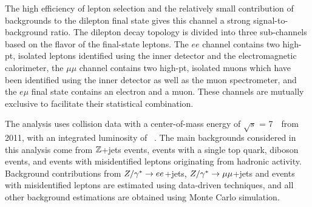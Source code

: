 The high efficiency of lepton selection and the relatively small contribution of backgrounds
to the dilepton final state %
gives this channel a strong signal-to-background ratio.
The dilepton decay topology is divided into three sub-channels based on the flavor of the
final-state leptons.
The $ee$ channel contains two high-pt, isolated leptons identified using 
the inner detector and the electromagnetic calorimeter, the $\mu\mu$ channel contains two
high-pt, isolated muons which have been identified using the inner detector as well as the muon
spectrometer, and the $e \mu$ final state contains an electron and a muon.
These channels are mutually exclusive to facilitate their statistical combination.



The analysis uses collision data with a center-of-mass energy of
$\sqrt{s}$ = 7~\TeV\ from 2011, with an integrated luminosity of \lumitotpm~\cite{lumiPub, lumi}.
The main backgrounds considered in this analysis come from
$\mathbb{Z}$+jets events, events with a single top quark,
diboson events, and events with misidentified leptons originating from hadronic activity.
Background contributions from
$Z/\gamma^{*} \rightarrow ee$+jets, $Z/\gamma^{*} \rightarrow\mu\mu$+jets and events with
misidentified leptons are estimated using data-driven techniques, and all
other background estimations are obtained using Monte Carlo simulation.


